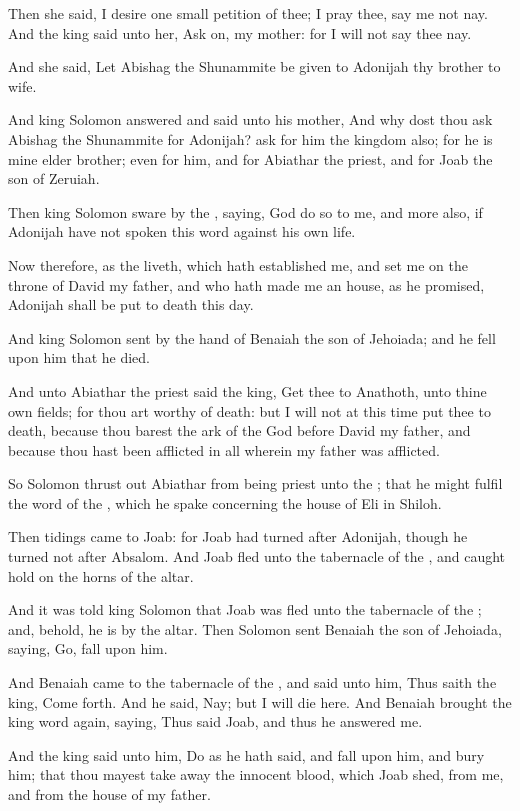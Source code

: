 \Verse Then she said, I desire one small petition of thee; I pray thee, say me not nay. And the king said unto her, Ask on, my mother: for I will not say thee nay.

\Verse And she said, Let Abishag the Shunammite be given to Adonijah thy brother to wife.

\Verse And king Solomon answered and said unto his mother, And why dost thou ask Abishag the Shunammite for Adonijah? ask for him the kingdom also; for he is mine elder brother; even for him, and for Abiathar the priest, and for Joab the son of Zeruiah.

\Verse Then king Solomon sware by the \LORD, saying, God do so to me, and more also, if Adonijah have not spoken this word against his own life.

\Verse Now therefore, as the \LORD liveth, which hath established me, and set me on the throne of David my father, and who hath made me an house, as he promised, Adonijah shall be put to death this day.

\Verse And king Solomon sent by the hand of Benaiah the son of Jehoiada; and he fell upon him that he died.

\Verse And unto Abiathar the priest said the king, Get thee to Anathoth, unto thine own fields; for thou art worthy of death: but I will not at this time put thee to death, because thou barest the ark of the \LORD God before David my father, and because thou hast been afflicted in all wherein my father was afflicted.

\Verse So Solomon thrust out Abiathar from being priest unto the \LORD; that he might fulfil the word of the \LORD, which he spake concerning the house of Eli in Shiloh.

\Verse Then tidings came to Joab: for Joab had turned after Adonijah, though he turned not after Absalom. And Joab fled unto the tabernacle of the \LORD, and caught hold on the horns of the altar.

\Verse And it was told king Solomon that Joab was fled unto the tabernacle of the \LORD; and, behold, he is by the altar. Then Solomon sent Benaiah the son of Jehoiada, saying, Go, fall upon him.

\Verse And Benaiah came to the tabernacle of the \LORD, and said unto him, Thus saith the king, Come forth. And he said, Nay; but I will die here. And Benaiah brought the king word again, saying, Thus said Joab, and thus he answered me.

\Verse And the king said unto him, Do as he hath said, and fall upon him, and bury him; that thou mayest take away the innocent blood, which Joab shed, from me, and from the house of my father.

